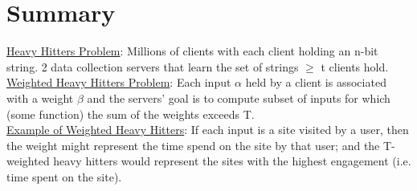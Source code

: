 
\clearpage
{}

%
\setcounter{section}{0} %

\section{Summary}
\underline{Heavy Hitters Problem}: Millions of clients with each client holding an n-bit string. 2 data collection servers that learn the set of strings $\ge$ t clients hold.\\

\underline{Weighted Heavy Hitters Problem}: Each input $\alpha$ held by a client is associated with a weight $\beta$ and the servers' goal is to compute subset of inputs for which (some function) the sum of the weights exceeds T.\\

\underline{Example of Weighted Heavy Hitters}: If each input is a site visited by a user, then the weight might represent the time spend on the site by that user; and the T-weighted heavy hitters would represent the sites with the highest engagement (i.e. time spent on the site).

